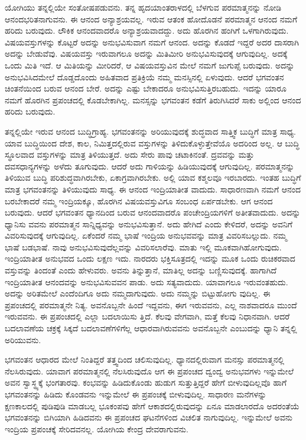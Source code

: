 ಯೋಗಿಯು ತನ್ನಲ್ಲಿಯೇ ಸಂತೋಷಪಡುವನು. ತನ್ನ ಹೃದಯಾಂತರಾಳದಲ್ಲಿ ಬೆಳಗುವ ಪರಮಾತ್ಮನನ್ನು ನೋಡಿ ಆನಂದಭರಿತನಾಗುವನು. ಈ ಆನಂದ ಅನ್ಯಾಶ್ರಯವಲ್ಲ. ಇರುವ ಆತಂಕ ಹೋದೊಡನೆ ಪರಮಾತ್ಮನ ಆನಂದ ನಮಗೆ ಹರಿದು ಬರುವುದು. ಲೌಕಿಕ ಆನಂದವಾದರೊ ಅನ್ಯಾಶ್ರಯವಾದದ್ದು. ಅದು ಹೊರಗಿನ ಹಂಗಿಗೆ ಒಳಗಾಗಿರುವುದು. ವಿಷಯವಸ್ತುಗಳನ್ನು ಕೊಟ್ಟರೆ ಅದನ್ನು ಅನುಭವಿಸುವಾಗ ನಮಗೆ ಆನಂದ. ಅದನ್ನು ಕೊಡದೆ ಇದ್ದರೆ ಅದರ ದಾಸರಾಗಿ ಅದನ್ನು ಬೇಡುವೆವು. ವಿಷಯವಸ್ತು ಇರುವಾಗಲೂ ಅದನ್ನು ಮಿತಿಮೀರಿ ಅನುಭವಿಸುವುದಕ್ಕೆ ಆಗುವುದಿಲ್ಲ. ಅದಕ್ಕೆ ಒಂದು ಮಿತಿ ಇದೆ. ಆ ಮಿತಿಯನ್ನು ಮೀರಿದರೆ, ಆ ವಿಷಯವಸ್ತುವಿನ ಮೇಲೆ ನಮಗೆ ಜುಗುಪ್ಸೆ ಬರುವುದು. ಅದನ್ನು ಅನುಭವಿಸಿದಮೇಲೆ ದೊಡ್ಡದೊಂದು ಅಹಿತವಾದ ಪ್ರತಿಕ್ರಿಯೆ ನಮ್ಮ ಮನಸ್ಸಿನಲ್ಲಿ ಏಳುವುದು. ಆದರೆ ಭಗವಂತನ ಚಿಂತನೆಯಿಂದ ಬರುವ ಆನಂದ ಬೇರೆ. ಅದನ್ನು ಎಷ್ಟು ಬೇಕಾದರೂ ಅನುಭವಿಸುತ್ತಿರಬಹುದು. ಇದನ್ನು ಯಾರೂ ನಮಗೆ ಹೊರಗಿನ ಪ್ರಪಂಚದಲ್ಲಿ ಕೊಡಬೇಕಾಗಿಲ್ಲ. ಮನಸ್ಸನ್ನು ಭಗವಂತನ ಕಡೆಗೆ ತಿರುಗಿಸಿದರೆ ಸಾಕು ಅಲ್ಲಿಂದ ಆನಂದ ಹರಿದು ಬರುವುದು.

ತನ್ನಲ್ಲಿಯೇ ಇರುವ ಆನಂದ ಬುದ್ಧಿಗ್ರಾಹ್ಯ. ಭಗವಂತನನ್ನು ಅರಿಯುವುದಕ್ಕೆ ಶುದ್ಧವಾದ ಸಾತ್ತ್ವಿಕ ಬುದ್ಧಿಗೆ ಮಾತ್ರ ಸಾಧ್ಯ. ಯಾವ ಬುದ್ಧಿಯಿಂದ ದೇಶ, ಕಾಲ, ನಿಮಿತ್ತದಲ್ಲಿರುವ ವಸ್ತುಗಳನ್ನು ತಿಳಿದುಕೊಳ್ಳುತ್ತೇವೆಯೊ ಅದರಿಂದ ಅಲ್ಲ. ಆ ಬುದ್ಧಿ ಸ್ಥೂಲವಾದ ವಸ್ತುಗಳನ್ನು ಮಾತ್ರ ತಿಳಿಯುತ್ತದೆ. ಅದು ಸೇರು ಪಾವು ಚಟಾಕಿನಂತೆ. ದ್ರವವನ್ನು ಮತ್ತು ದವಸಧಾನ್ಯಗಳನ್ನು ಅಳೆದು ತೂಗುವುದು. ಆದರೆ ಅದು ಗಾಳಿಯನ್ನು ಹಿಡಿಯುವುದಕ್ಕೆ ಆಗುವುದಿಲ್ಲ. ಪರಮಾತ್ಮನನ್ನು ತಿಳಿಯುವ ಬುದ್ಧಿ ಪರಿಶುದ್ಧವಾಗಿರಬೇಕು, ಏಕಾಗ್ರವಾಗಿರಬೇಕು. ಅಲ್ಲಿ ಯಾವ ಕಶ್ಮಲವೂ ಇರಬಾರದು. ಇಂತಹ ಬುದ್ಧಿಗೆ ಮಾತ್ರ ಭಗವಂತನನ್ನು ತಿಳಿಯುವುದು ಸಾಧ್ಯ. ಈ ಆನಂದ ಇಂದ್ರಿಯಾತೀತ ವಾದುದು. ಸಾಧಾರಣವಾಗಿ ನಮಗೆ ಆನಂದ ಬರಬೇಕಾದರೆ ನಮ್ಮ ಇಂದ್ರಿಯಕ್ಕೂ, ಹೊರಗಿನ ವಿಷಯವಸ್ತುವಿಗೂ ಸಂಬಂಧ ಏರ್ಪಡಬೇಕು. ಆಗ ಆನಂದ ಬರುವುದು. ಆದರೆ ಭಗವಂತನ ಧ್ಯಾನದಿಂದ ಬರುವ ಆನಂದವಾದರೊ ಪಂಚೇಂದ್ರಿಯಗಳಿಗೆ ಅತೀತವಾದುದು. ಅದನ್ನು ಧ್ಯಾನಿಸು ವವನು ಪರಮಾತ್ಮನ ಸಾನ್ನಿಧ್ಯವನ್ನು ಅನುಭವಿಸುತ್ತಾನೆ. ಅದು ಹೇಗಿದೆ ಎಂದು ಕೇಳಿದರೆ, ಅದನ್ನು ಅವನಿಗೆ ವಿವರಿಸುವುದಕ್ಕೆ ಆಗುವುದಿಲ್ಲ. ಏಕೆಂದರೆ ನಮ್ಮ ಭಾಷೆ ಇಂದ್ರಿಯ ಅನುಭವವನ್ನು ಮಾತ್ರ ವಿವರಿಸಬಲ್ಲುದು. ನಮ್ಮ ಭಾಷೆ ಬಡಭಾಷೆ. ನಾವು ಅನುಭವಿಸುವುದೆಲ್ಲವನ್ನು ವಿವರಿಸಲಾರೆವು. ಮಾತು ಇಲ್ಲಿ ಮೂಕವಾಗಿಹೋಗುವುದು. ಇಂದ್ರಿಯಾತೀತ ಅನುಭವದ ಒಂದು ಲಕ್ಷಣ ಇದು. ನಾರದರು ಭಕ್ತಿಸೂತ್ರದಲ್ಲಿ ಇದನ್ನು ಮೂಕ ಒಂದು ರುಚಿಕರವಾದ ವಸ್ತುವನ್ನು ತಿಂದಂತೆ ಎಂದು ಹೇಳುವರು. ಅವನು ತಿನ್ನುತ್ತಾನೆ, ಮಾತಿಲ್ಲ ಅದನ್ನು ಬಣ್ಣಿಸುವುದಕ್ಕೆ. ಹಾಗಾಗಿದೆ ಇಂದ್ರಿಯಾತೀತ ಆನಂದವನ್ನು ಅನುಭವಿಸುವವನ ಪಾಡು. ಅದು ಸತ್ಯವಾದುದು. ಯಾವಾಗಲೂ ಇರುವಂತಹುದು. ಅದನ್ನು ಅರಿತಮೇಲೆ ಎಂದೆಂದಿಗೂ ಅದು ನಮ್ಮದಾಗುವುದು. ಅದು ನಮ್ಮನ್ನು ಬಿಟ್ಟುಹೋಗು ವುದಿಲ್ಲ. ಈ ಪ್ರಪಂಚದಲ್ಲಿ ಪರಮಾತ್ಮನೇ ನಿತ್ಯ. ಅವನೊಬ್ಬನೇ ಹಿಂದೆ ಇದ್ದವನು, ಈಗ ಇರುವವನು, ಎಲ್ಲ ನಾಶವಾದರೂ ಮುಂದೆ ಇರುವವನು. ಈ ಪ್ರಪಂಚದಲ್ಲಿ ಎಲ್ಲಾ ಬದಲಾಯಿಸು ತ್ತಿದೆ. ಕೆಲವು ವೇಗವಾಗಿ, ಮತ್ತೆ ಕೆಲವು ನಿಧಾನವಾಗಿ. ಆದರೆ ಬದಲಾವಣೆಯ ಚಕ್ರಕ್ಕೆ ಸಿಕ್ಕದೆ ಬದಲಾವಣೆಗಳಿಗೆಲ್ಲ ಆಧಾರವಾಗಿರುವವನು ಅವನೊಬ್ಬನೇ ಎಂಬುದನ್ನು ಧ್ಯಾನಿ ತನ್ನಲ್ಲಿ ಅರಿಯುವನು.

ಭಗವಂತನ ಆಧಾರದ ಮೇಲೆ ನಿಂತಿದ್ದರೆ ತತ್ತ್ವದಿಂದ ಚಲಿಸುವುದಿಲ್ಲ. ಧ್ಯಾನದಲ್ಲಿರುವಾಗ ಮನಸ್ಸು ಪರಮಾತ್ಮನಲ್ಲಿ ನೆಲಸಿರುವುದು. ಯಾವಾಗ ಪರಮಾತ್ಮನಲ್ಲಿ ನೆಲಸಿರುವುದೊ ಆಗ ಈ ಪ್ರಪಂಚದ ದ್ವಂದ್ವ ಅನುಭವಗಳು ಇನ್ನುಮೇಲೆ ಅವನ ಸ್ವಾಸ್ಥ್ಯಕ್ಕೆ ಭಂಗತಾರವು. ಕಂಭವನ್ನು ಹಿಡಿದುಕೊಂಡು ಹುಡುಗ ಸುತ್ತುತ್ತಿದ್ದರೆ ಹೇಗೆ ಬೀಳುವುದಿಲ್ಲವೊ ಹಾಗೆ ಭಗವಂತನನ್ನು ಹಿಡಿದು ಕೊಂಡವನು ಇನ್ನುಮೇಲೆ ಈ ಪ್ರಪಂಚಕ್ಕೆ ಬೀಳುವುದಿಲ್ಲ. ಸಾಧಾರಣ ಮನೆಗಳನ್ನು ಕ್ಷಣಕಾಲದಲ್ಲಿ ಪುಡಿಪುಡಿ ಮಾಡಬಲ್ಲ ಭೂಕಂಪವು ಹೇಗೆ ಆಕಾಶದಲ್ಲಿರುವುದನ್ನು ಏನೂ ಮಾಡಲಾರದೊ ಅದರಂತೆಯೆ ಭಗವಂತನನ್ನು ಬಿಗಿಯಾಗಿ ಹಿಡಿದವನು ಈ ಪ್ರಪಂಚದ ಘಟನೆಗಳಿಂದ ವಿಚಲಿತ ನಾಗುವುದಿಲ್ಲ. ಇನ್ನುಮೇಲೆ ಅವನು ಇಂದ್ರಿಯ ಪ್ರಪಂಚಕ್ಕೆ ಸೇರಿದವನಲ್ಲ. ಯೋಗಿಯ ಕೇಂದ್ರ ದೇವರಾಗುವನು.

